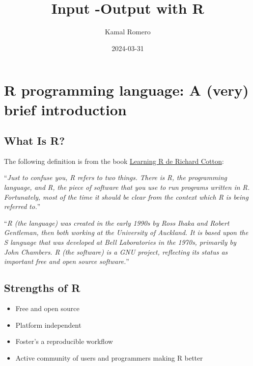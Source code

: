 \documentclass[
  letterpaper,
  DIV=11,
  numbers=noendperiod]{scrartcl}
\title{Input -Output with R}
\author{Kamal Romero}
\date{2024-03-31}
\renewcommand*\contentsname{Table of contents}
\newcommand\contentsname{Table of contents}
\begin{document}
\maketitle
\ifdefined\Shaded\renewenvironment{Shaded}{\begin{tcolorbox}[boxrule=0pt, borderline west={3pt}{0pt}{shadecolor}, interior hidden, frame hidden, breakable, enhanced, sharp corners]}{\end{tcolorbox}}\fi

\renewcommand*\contentsname{Table of contents}
{
\hypersetup{linkcolor=}
\setcounter{tocdepth}{3}
\tableofcontents
}
\hypertarget{r-programming-language-a-very-brief-introduction}{%
\section{R programming language: A (very) brief
introduction}\label{r-programming-language-a-very-brief-introduction}}

\hypertarget{what-is-r}{%
\subsection{What Is R?}\label{what-is-r}}

The following definition is from the book
\href{https://www.oreilly.com/library/view/learning-r/9781449357160/}{Learning
R de Richard Cotton}:

``\emph{Just to confuse you, R refers to two things. There is R, the
programming language, and R, the piece of software that you use to run
programs written in R. Fortunately, most of the time it should be clear
from the context which R is being referred to.}''

``\emph{R (the language) was created in the early 1990s by Ross Ihaka
and Robert Gentleman, then both working at the University of Auckland.
It is based upon the S language that was developed at Bell Laboratories
in the 1970s, primarily by John Chambers. R (the software) is a GNU
project, reflecting its status as important free and open source
software.}''

\hypertarget{strengths-of-r}{%
\subsection{Strengths of R}\label{strengths-of-r}}

\begin{itemize}
\item
  Free and open source
\item
  Platform independent
\item
  Foster's a reproducible workflow
\item
  Active community of users and programmers making R better
\end{itemize}
\end{document}
